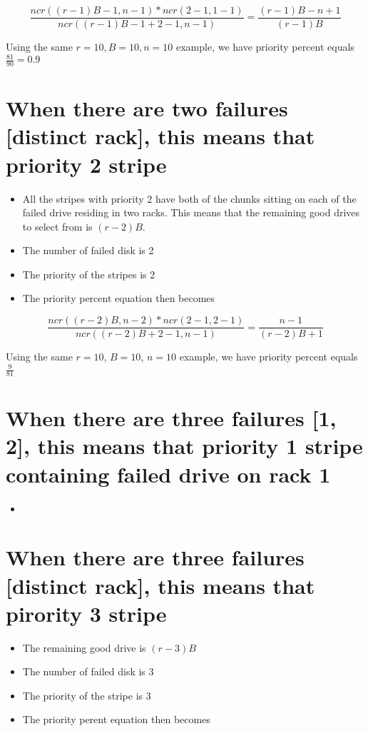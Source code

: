 \documentclass[journal]{IEEEtran}
\begin{document}
\begin{equation*}
  \frac{ncr((r-1)B-1, n-1)*ncr(2-1, 1-1)}{ncr((r-1)B-1+2-1, n-1)}=\frac{(r-1)B-n+1}{(r-1)B}
\end{equation*}

Using the same $r=10, B=10, n=10$ example, we have priority percent equals $\frac{81}{90}=0.9$

\section{When there are two failures [distinct rack], this means that \textbf{priority 2 stripe}}
\begin{itemize}
  \item All the stripes with priority 2 have both of the chunks sitting on each of the failed drive residing in two racks. This means that the remaining good drives to select from is $(r-2)B$.
  \item The number of failed disk is 2
  \item The priority of the stripes is 2
  \item The priority percent equation then becomes
\end{itemize}

\begin{equation*}
  \frac{ncr((r-2)B, n-2)*ncr(2-1, 2-1)}{ncr((r-2)B+2-1, n-1)}=\frac{n-1}{(r-2)B+1}
\end{equation*}

Using the same $r=10$, $B=10$, $n=10$ example, we have priority percent equals $\frac{9}{81}$

\section*{When there are three failures [1, 2], this means that \textbf{priority 1 stripe} containing failed drive on rack 1}
\begin{itemize}
  \item 
\end{itemize}

\section{When there are three failures [distinct rack], this means that \textbf{pirority 3 stripe} }
\begin{itemize}
  \item The remaining good drive is $(r-3)B$
  \item The number of failed disk is 3
  \item The priority of the stripe is 3
  \item The priority perent equation then becomes
\end{itemize}
\end{document}
